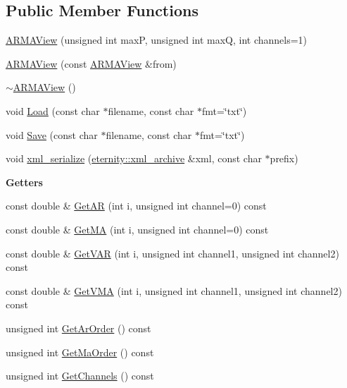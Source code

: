 \subsection*{Public Member Functions}
\begin{DoxyCompactItemize}
\item 
\hyperlink{classtsa_1_1_a_r_m_a_view_a6b11811890252e645626e61fe434ea56}{A\+R\+M\+A\+View} (unsigned int maxP, unsigned int maxQ, int channels=1)
\item 
\hyperlink{classtsa_1_1_a_r_m_a_view_a1f28a41958cdf03016ffbae033a222bb}{A\+R\+M\+A\+View} (const \hyperlink{classtsa_1_1_a_r_m_a_view}{A\+R\+M\+A\+View} \&from)
\item 
\hyperlink{classtsa_1_1_a_r_m_a_view_a44779ce53323f8e6a1457974e9242004}{$\sim$\+A\+R\+M\+A\+View} ()
\item 
void \hyperlink{classtsa_1_1_a_r_m_a_view_aa6144eb86771f2c9d2cc95ac415acaba}{Load} (const char $\ast$filename, const char $\ast$fmt=\char`\"{}txt\char`\"{})
\item 
void \hyperlink{classtsa_1_1_a_r_m_a_view_a022ef32e6b0c2012707317cf1fbf9a54}{Save} (const char $\ast$filename, const char $\ast$fmt=\char`\"{}txt\char`\"{})
\item 
void \hyperlink{classtsa_1_1_a_r_m_a_view_ac667fd050280837056f3397fdb21afe6}{xml\+\_\+serialize} (\hyperlink{classeternity_1_1xml__archive}{eternity\+::xml\+\_\+archive} \&xml, const char $\ast$prefix)
\end{DoxyCompactItemize}
\begin{Indent}\textbf{ Getters}\par
\begin{DoxyCompactItemize}
\item 
const double \& \hyperlink{classtsa_1_1_a_r_m_a_view_a1a6f6606b2c5c8d0ef7d1484538e57d3}{Get\+AR} (int i, unsigned int channel=0) const
\item 
const double \& \hyperlink{classtsa_1_1_a_r_m_a_view_ad1f9e11168b5fb4c62ce4afb81ed0c86}{Get\+MA} (int i, unsigned int channel=0) const
\item 
const double \& \hyperlink{classtsa_1_1_a_r_m_a_view_a217094c2da79081413b74c8793dfbee3}{Get\+V\+AR} (int i, unsigned int channel1, unsigned int channel2) const
\item 
const double \& \hyperlink{classtsa_1_1_a_r_m_a_view_a60f3835003f645ba1947e34e08e58a27}{Get\+V\+MA} (int i, unsigned int channel1, unsigned int channel2) const
\item 
unsigned int \hyperlink{classtsa_1_1_a_r_m_a_view_a022eacefccd6be3b5efa36b656295206}{Get\+Ar\+Order} () const
\item 
unsigned int \hyperlink{classtsa_1_1_a_r_m_a_view_a50b9c68a7cafc52b47a35b11301d3adb}{Get\+Ma\+Order} () const
\item 
unsigned int \hyperlink{classtsa_1_1_a_r_m_a_view_a9a45f52a936aa86414c5afb43592f98e}{Get\+Channels} () const
\end{DoxyCompactItemize}
\end{Indent}
